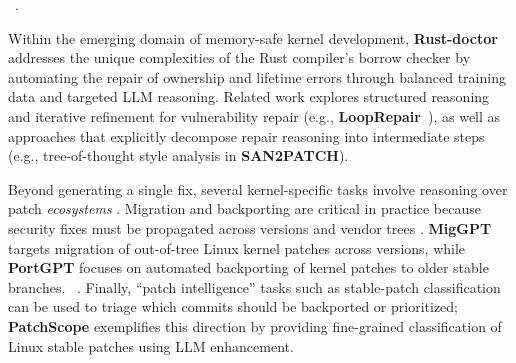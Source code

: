 ~.

Within the emerging domain of memory-safe kernel development, \textbf{Rust-doctor} \cite{yang2025rust} addresses the unique complexities of the Rust compiler's borrow checker by automating the repair of ownership and lifetime errors through balanced training data and targeted LLM reasoning. Related work explores structured reasoning and iterative refinement for vulnerability repair (e.g., \textbf{LoopRepair}~\cite{looprepair25}), as well as approaches that explicitly decompose repair reasoning into intermediate steps (e.g., tree-of-thought style analysis in \textbf{SAN2PATCH})\cite{kim2025logs}. 

Beyond generating a single fix, several kernel-specific tasks involve reasoning over patch \emph{ecosystems} \cite{dang2025miggpt}. 
Migration and backporting are critical in practice because security fixes must be propagated across versions and vendor trees \cite{dang2025miggpt,li2025portgpt}. 
\textbf{MigGPT} targets migration of out-of-tree Linux kernel patches across versions\cite{dang2025miggpt}, while \textbf{PortGPT} focuses on automated backporting of kernel patches to older stable branches\cite{li2025portgpt}. 
~.
Finally, ``patch intelligence'' tasks such as stable-patch classification can be used to triage which commits should be backported or prioritized; 
\textbf{PatchScope} exemplifies this direction by providing fine-grained classification of Linux stable patches using LLM enhancement\cite{liu2025patchscope}.


